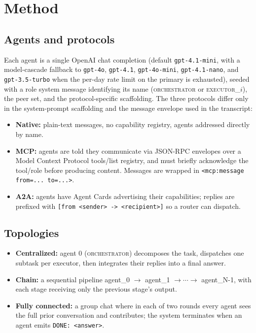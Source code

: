 \section{Method}

\subsection{Agents and protocols}

Each agent is a single OpenAI chat completion (default
\texttt{gpt-4.1-mini}, with a model-cascade fallback to
\texttt{gpt-4o}, \texttt{gpt-4.1}, \texttt{gpt-4o-mini},
\texttt{gpt-4.1-nano}, and \texttt{gpt-3.5-turbo} when the per-day rate
limit on the primary is exhausted), seeded with a role
system message identifying its name (\textsc{orchestrator} or
\textsc{executor}\_$i$), the peer set, and the protocol-specific
scaffolding. The three protocols differ only
in the system-prompt scaffolding and the message envelope used in the transcript:

\begin{itemize}
\item \textbf{Native:} plain-text messages, no capability registry, agents addressed
      directly by name.
\item \textbf{MCP:} agents are told they communicate via JSON-RPC envelopes over a
      Model Context Protocol tools/list registry, and must briefly acknowledge the
      tool/role before producing content. Messages are wrapped in
      \texttt{<mcp:message from=... to=...>}.
\item \textbf{A2A:} agents have Agent Cards advertising their capabilities; replies are
      prefixed with \texttt{[from <sender> -> <recipient>]} so a router can dispatch.
\end{itemize}

\subsection{Topologies}

\begin{itemize}
\item \textbf{Centralized:} agent 0 (\textsc{orchestrator}) decomposes the task,
      dispatches one subtask per executor, then integrates their replies into a final
      answer.
\item \textbf{Chain:} a sequential pipeline agent\_0 $\rightarrow$ agent\_1
      $\rightarrow \cdots \rightarrow$ agent\_{N-1}, with each stage receiving only the
      previous stage's output.
\item \textbf{Fully connected:} a group chat where in each of two rounds every agent
      sees the full prior conversation and contributes; the system terminates when an
      agent emits \texttt{DONE: <answer>}.
\end{itemize}

